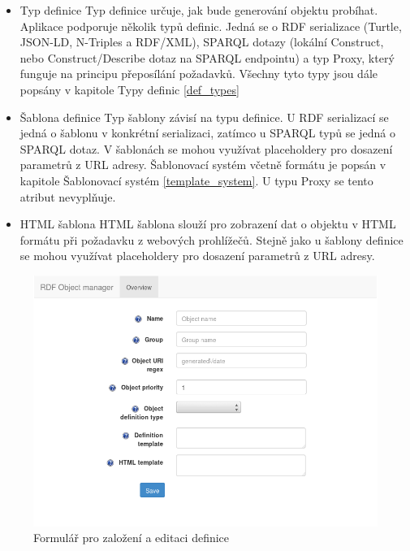 \documentclass[thesis=B,czech]{FITthesis}[2012/06/26]
\begin{document}
\begin{itemize}
      \item Typ definice
	\subitem Typ definice určuje, jak bude generování objektu probíhat. Aplikace podporuje několik typů definic. Jedná se o RDF serializace (Turtle, JSON-LD, 
	N-Triples a RDF/XML), SPARQL dotazy (lokální Construct, nebo Construct/Describe dotaz na SPARQL endpointu) a typ Proxy, 
	který funguje na principu přeposílání požadavků.
	Všechny tyto typy jsou dále popsány v kapitole Typy definic \ref{def_types}
	\newpage
    \item Šablona definice
      \subitem Typ šablony závisí na typu definice. U RDF serializací se jedná o šablonu v konkrétní serializaci, zatímco u SPARQL typů
      se jedná o SPARQL dotaz. V šablonách se mohou využívat placeholdery pro dosazení parametrů z URL adresy. Šablonovací systém včetně formátu je popsán v kapitole
      Šablonovací systém \ref{template_system}. U typu Proxy se tento atribut nevyplňuje.
      
      \item HTML šablona
      \subitem HTML šablona slouží pro zobrazení dat o objektu v HTML formátu při požadavku z webových prohlížečů. Stejně jako u šablony definice se mohou využívat
      placeholdery pro dosazení parametrů z URL adresy.	
	
    \end{itemize}
    \begin{figure}\centering
 	\includegraphics[width=\textwidth]{web_create}
 	\caption[Formulář pro založení a editaci definice]{Formulář pro založení a editaci definice}\label{web_create}		
  \end{figure}
    
\end{document}
